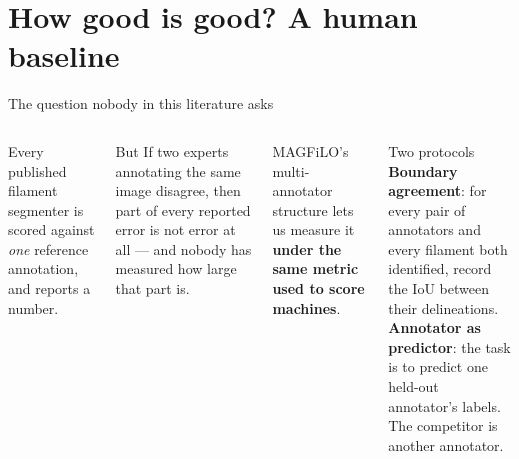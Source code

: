 \documentclass[aspectratio=169,xcolor=dvipsnames]{beamer}
\begin{document}
\section{How good is good? A human baseline}

\begin{frame}{The question nobody in this literature asks}
  \begin{columns}
      Every published filament segmenter is scored against \emph{one} reference annotation, and reports a number.
      \vspace{0.3cm}
      \begin{alertblock}{But}
        If two experts annotating the same image disagree, then part of every reported error is not error at all --- and nobody has measured how large that part is.
      \end{alertblock}
      \vspace{0.3cm}
      MAGFiLO's multi-annotator structure lets us measure it \textbf{under the same metric used to score machines}.
      \begin{block}{Two protocols}
        \small
        \textbf{Boundary agreement}: for every pair of annotators and every filament both identified, record the IoU between their delineations.\\[4pt]
        \textbf{Annotator as predictor}: the task is to predict one held-out annotator's labels. The competitor is another annotator.
      \end{block}
  \end{columns}
\end{frame}
\end{document}
